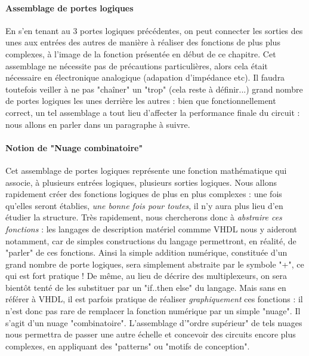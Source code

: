\paragraph{Assemblage de portes logiques}

En s'en tenant au 3 portes logiques précédentes, on peut connecter les sorties des unes aux entrées des autres de manière à réaliser des fonctions de plus plus complexes, à l'image
de la fonction présentée en début de ce chapitre. Cet assemblage ne nécessite pas de précautions particulières, alors cela était nécessaire en électronique analogique (adapation d'impédance etc).
Il faudra toutefois veiller à ne pas "chaîner" un "trop" (cela reste à définir...) grand nombre de portes logiques les unes derrière les autres : bien que fonctionnellement correct, un tel assemblage
a tout lieu d'affecter la performance finale du circuit : nous allons en parler dans un paragraphe à suivre.

\paragraph{Notion de "Nuage combinatoire"}
Cet assemblage de portes logiques représente une fonction mathématique qui associe, à plusieurs entrées logiques, plusieurs sorties logiques. Nous allons rapidement
créer des fonctions logiques de plus en plus complexes : une fois qu'elles seront établies, {\it une bonne fois pour toutes}, il n'y aura plus lieu d'en étudier la structure.
Très rapidement, nous chercherons donc à {\it abstraire ces fonctions} : les langages de description matériel commme VHDL nous y aideront notamment, car de simples constructions
du langage permettront, en réalité, de "parler" de ces fonctions. Ainsi la simple addition numérique, constituée d'un grand nombre de porte logiques, sera simplement abstraite par le symbole "+", ce qui
est fort pratique ! De même, au lieu de décrire des multiplexeurs, on sera bientôt tenté de les substituer par un "if..then else" du langage. Mais sans en référer à VHDL, il est
parfois pratique de réaliser {\it graphiquement} ces fonctions : il n'est donc pas rare de remplacer la fonction numérique par un simple "nuage". Il s'agit d'un nuage "combinatoire".
L'assemblage d'"ordre supérieur" de tels nuages nous permettra de passer une autre échelle et concevoir des circuits encore plus complexes, en appliquant des "patterns" ou "motifs de conception".

